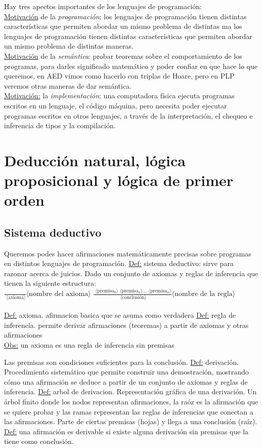 \documentclass[12pt]{extarticle}
\def\definicion{\newline\underline{Def:} }
\def\observacion{\underline{Obs:} }
\newcommand\regla[3]{$\frac{\text{#3}}{\text{#2}} \text{#1}$}
\begin{document}
Hay tres apectos importantes de los lenguajes de programación: \\
\underline{Motivación} de la \textit{programación}: los lenguajes de programación tienen distintas características que permiten abordar un mismo problema de distintas ma los lenguajes de programación tienen distintas características que permiten abordar un mismo problema de distintas maneras. \\
\underline{Motivación} de la \textit{semántica}: probar teoremas sobre el comportamiento de los programas, para darles significado matemático y poder confiar en que hace lo que queremos, en AED vimos como hacerlo con triplas de Hoare, pero en PLP veremos otras maneras de dar semántica. \\
\underline{Motivación:} la \textit{implementación}: una computadora física ejecuta programas escritos en un lenguaje, el código máquina, pero necesita poder ejecutar programas escritos en otros lenguajes, a través de la interpretación, el chequeo e inferencia de tipos y la compilación. \\

\section{Deducción natural, lógica proposicional y lógica de primer orden}
\subsection{Sistema deductivo}
Queremos podes hacer afirmaciones matemáticamente precisas sobre programas en distintos lenguajes de programación.
\definicion sistema deductivo: sirve para razonar acerca de juicios. Dado un conjunto de axiomas y reglas de inferencia que tienen la siguiente estructura: \\

\regla{$\langle$nombre del axioma$\rangle$}{
  $\langle$axioma$\rangle$
}{}
\regla{$\langle$nombre de la regla$\rangle$}{
  $\langle$conclusión$\rangle$
}{
  $\langle$premisa$_0\rangle$
  $\langle$premisa$_1\rangle$
  ...
  $\langle$premisa$_n\rangle$
} \\ \\
\definicion axioma. afirmacion basica que se asuma como verdadera
\definicion regla de inferencia. permite derivar afirmaciones (teoremas) a partir de axiomas y otras afirmaciones \\
\observacion un axioma es una regla de inferencia sin premisas

Las premisas son condiciones suficientes para la conclusión.
\definicion derivación. Procedimiento sistemático que permite construir una demostración, mostrando cómo una afirmación se deduce a partir de un conjunto de axiomas y reglas de inferencia.
\definicion arbol de derivacion. Representación gráfica de una derivación. Un árbol finito donde los nodos representan afirmaciones, la raóz es la afirmación que se quiere probar y las ramas representan las reglas de inferencias que conectan a las afirmaciones. Parte de ciertas premisas (hojas) y llega a una conclusión (raíz).
\definicion una afirmación es derivable si existe alguna derivación sin premisas que la tiene como conclusión.
\end{document}
